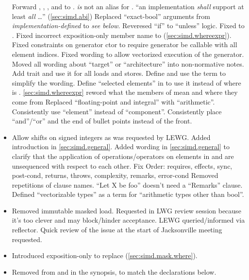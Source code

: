 \begin{itemize}
  \chck Forward , , , and  to .
  \chck {} \emph{is} not an alias for .
  \chck “an implementation \emph{shall} support at least \emph{all} \ldots” (\ref{sec:simd.abi})
  \chck Replaced “exact-bool” arguments from \emph{implementation-defined} to \emph{see below}.
  \chck Reveresed “if” to “unless” logic.
  \chck Fixed  to .
  \chck Fixed incorrect  exposition-only member name to  (\ref{sec:simd.whereexpr}).
  \chck Fixed constraints on generator ctor to require generator be callable with all element indices.
  \chck Fixed wording to allow vectorized execution of the generator.
  \chck Moved all wording about “target” or “architecture” into non-normative notes.
  \chck Add  trait and use it for all loads and stores.
  \chck Define and use the term \emph{\realArithmeticType} to simplify the wording.
  \chck Define “selected elements” in  to use it instead of  where  is \true.
  \chck \ref{sec:simd.whereexpr} reword what the members of  mean and where they come from
  \chck Replaced “floating-point and integral” with “arithmetic”.
  \chck Consistently use “element” instead of “component”.
  \chck Consistently place “and”/“or” and the end of bullet points instead of the front.
  \item Allow shifts on signed integers as was requested by LEWG.
  \chck Added introduction in \ref{sec:simd.general}.
  \chck Added wording in \ref{sec:simd.general} to clarify that the application of operations/operators on elements in \simd and \mask are unsequenced with respect to each other.
  \chck Fix Order: requires, effects, sync, post-cond, returns, throws, complexity, remarks, error-cond
  \chck Removed repetitions of clause names.
  \chck “Let X be foo” doesn't need a “Remarks” clause.
  \chck Defined “vectorizable types” as a term for “arithmetic types other than bool”.
  \item Removed immutable masked load.
    Requested in LWG review session because it's too clever and may block/hinder acceptance.
    LEWG queried/informed via reflector.
    Quick review of the issue at the start of Jacksonville meeting requested.
  \item Introduced exposition-only  to replace  (\ref{sec:simd.mask.where}).
  \item Removed  from  and  in the synopsis, to match the declarations below.

\end{itemize}

